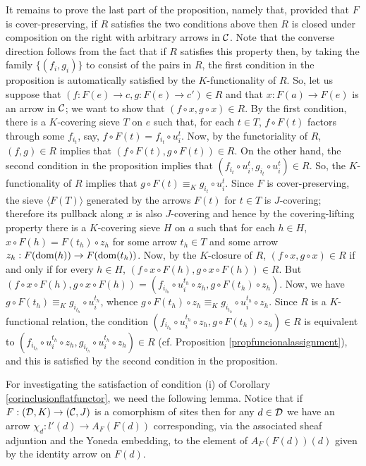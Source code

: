 \documentclass[a4paper,12pt]{article}
\begin{document}
\begin{proofs}
	It remains to prove the last part of the proposition, namely that, provided that $F$ is cover-preserving, if $R$ satisfies the two conditions above then $R$ is closed under composition on the right with arbitrary arrows in $\cal C$. Note that the converse direction follows from the fact that if $R$ satisfies this property then, by taking the family $\{(f_i, g_i)\}$ to consist of the pairs in $R$, the first condition in the proposition is automatically satisfied by the $K$-functionality of $R$. So, let us suppose that $(f:F(e)\to c, g:F(e)\to c')\in R$ and that $x:F(a)\to F(e)$ is an arrow in $\cal C$; we want to show that $(f\circ x, g\circ x)\in R$. By the first condition, there is a $K$-covering sieve $T$ on $e$ such that, for each $t\in T$, $f\circ F(t)$ factors through some $f_{i_{t}}$, say, $f\circ F(t)=f_{i_{t}}\circ u_{i}^{t}$. Now, by the functoriality of $R$, $(f, g)\in R$ implies that $(f\circ F(t), g\circ F(t))\in R$. On the other hand, the second condition in the proposition implies that $(f_{i_{t}}\circ u_{i}^{t}, g_{i_{t}}\circ u_{i}^{t})\in R$. So, the $K$-functionality of $R$ implies that $g\circ F(t) \equiv_{K} g_{i_{t}}\circ u_{i}^{t}$. Since $F$ is cover-preserving, the sieve $\langle F(T)\rangle $ generated by the arrows $F(t)$ for $t\in T$ is $J$-covering; therefore its pullback along $x$ is also $J$-covering and hence by the covering-lifting property there is a $K$-covering sieve $H$ on $a$ such that for each $h\in H$, $x\circ F(h)=F(t_{h})\circ z_{h}$ for some arrow $t_{h}\in T$ and some arrow $z_{h}:F(\textup{dom}(h))\to F(\textup{dom}(t_{h}))$. Now, by the $K$-closure of $R$, $(f\circ x, g\circ x)\in R$ if and only if for every $h\in H$, $(f\circ x\circ F(h), g\circ x\circ F(h))\in R$. But $(f\circ x\circ F(h), g\circ x\circ F(h))=(f_{i_{t_{h}}}\circ u_{i}^{t_{h}}\circ z_{h}, g\circ F(t_{h})\circ  z_{h})$. Now, we have $g\circ F(t_{h}) \equiv_{K} g_{i_{t_{h}}}\circ u_{i}^{t_{h}}$, whence $g\circ F(t_{h}) \circ z_{h} \equiv_{K} g_{i_{t_{h}}}\circ u_{i}^{t_{h}}\circ z_{h}$. Since $R$ is a $K$-functional relation, the condition $(f_{i_{t_{h}}}\circ u_{i}^{t_{h}}\circ z_{h}, g\circ F(t_{h})\circ  z_{h})\in R$ is equivalent to $(f_{i_{t_{h}}}\circ u_{i}^{t_{h}}\circ z_{h}, g_{i_{t_{h}}}\circ u_{i}^{t_{h}}\circ z_{h})\in R$ (cf. Proposition \ref{propfuncionalassignment}), and this is satisfied by the second condition in the proposition.     
\end{proofs}


For investigating the satisfaction of condition (i) of Corollary \ref{corinclusionflatfunctor}, we need the following lemma. Notice that if $F:({\cal D}, K)\to ({\cal C}, J)$ is a comorphism of sites then for any $d\in {\cal D}$ we have an arrow $\chi_{d}:l'(d)\to A_{F}(F(d))$ corresponding, via the associated sheaf adjuntion and the Yoneda embedding, to the element of $A_{F}(F(d))(d)$ given by the identity arrow on $F(d)$.
\end{document}
